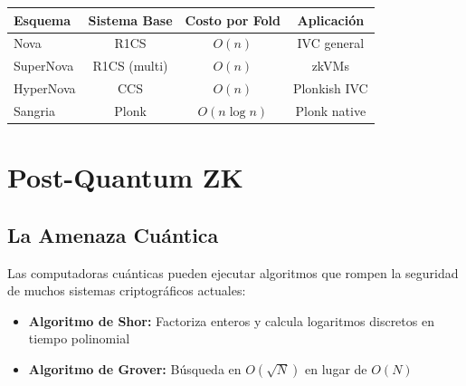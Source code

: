 \documentclass[11pt,a4paper,twoside]{book}
\begin{document}
\begin{center}
\begin{tabular}{lccc}
\toprule
\textbf{Esquema} & \textbf{Sistema Base} & \textbf{Costo por Fold} & \textbf{Aplicaci\'on} \\
\midrule
Nova & R1CS & $O(n)$ & IVC general \\
SuperNova & R1CS (multi) & $O(n)$ & zkVMs \\
HyperNova & CCS & $O(n)$ & Plonkish IVC \\
Sangria & Plonk & $O(n \log n)$ & Plonk native \\
\bottomrule
\end{tabular}
\end{center}

\section{Post-Quantum ZK}
\label{sec:post-quantum}

\subsection{La Amenaza Cu\'antica}

\begin{definition}
Las computadoras cu\'anticas pueden ejecutar algoritmos que rompen la seguridad de muchos sistemas criptogr\'aficos actuales:
\begin{itemize}
    \item \textbf{Algoritmo de Shor:} Factoriza enteros y calcula logaritmos discretos en tiempo polinomial
    \item \textbf{Algoritmo de Grover:} B\'usqueda en $O(\sqrt{N})$ en lugar de $O(N)$
\end{itemize}
\end{definition}
\end{document}
